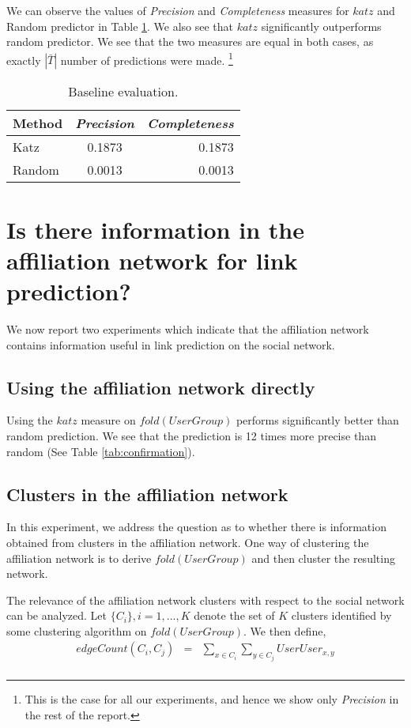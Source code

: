 \documentclass{report}
\begin{document}
We can observe the values of \textit{Precision} and \textit{Completeness} measures for $katz$ and Random predictor in Table \ref{tab:baseline}. We also see that $katz$ significantly outperforms random predictor. We see that the two measures are equal in both cases, as exactly $|\bar{T}|$ number of predictions were made.
\footnote{This is the case for all our experiments, and hence we show only \textit{Precision} in the rest of the report.}

\begin{table}
\centering
\begin{tabular}{| l | c | r |}
\hline
Method& \textit{Precision} & \textit{Completeness}\\
\hline
 Katz & 0.1873 & 0.1873\\
 Random & 0.0013 & 0.0013\\
\hline
\end{tabular}
\caption{Baseline evaluation.}
\label{tab:baseline}
\end{table} 

\section{Is there information in the affiliation network for link prediction?}
We now report two experiments which indicate that the affiliation network contains information useful in link prediction on the social network.

\subsection{Using the affiliation network directly}
Using the $katz$ measure on $fold(UserGroup)$ performs significantly better than random prediction. We see that the prediction is 12 times more precise than random (See Table \ref{tab:confirmation}).

\subsection{Clusters in the affiliation network}
In this experiment, we address the question as to whether there is information obtained from clusters in the affiliation network. One way of clustering the affiliation network is to derive $fold(UserGroup)$ and then cluster the resulting network.

The relevance of the affiliation network clusters with respect to the social network can be analyzed. Let $\{C_i\}, i = 1, ..., K$ denote the set of $K$ clusters identified by some clustering algorithm on $fold(UserGroup)$. We then define,
\begin{eqnarray*}
	edgeCount(C_i, C_j) &=& \sum_{x \in C_i}\sum_{y \in C_j} UserUser_{x,y}\\
\end{eqnarray*}
\end{document}
